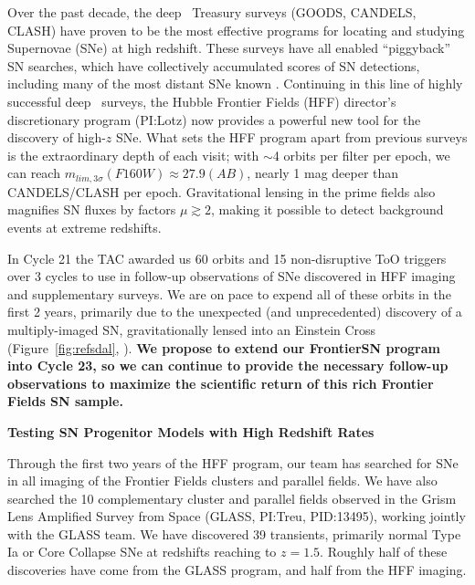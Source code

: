 \documentclass[12pt]{article}
\begin{document}
%
%
\justification          %

Over the past decade, the deep \HST\ Treasury surveys (GOODS, CANDELS,
CLASH) have proven to be the most effective programs for locating and
studying Supernovae (SNe) at high redshift.  These surveys have all
enabled ``piggyback'' SN searches, which have collectively accumulated
scores of SN detections, including many of the most distant SNe known
\citep{Riess:2007,Dahlen:2008,Graur:2014,Rodney:2014}.  Continuing in
this line of highly successful deep \HST\ surveys, the Hubble Frontier
Fields (HFF) director's discretionary program (PI:Lotz) now provides a
powerful new tool for the discovery of high-$z$ SNe.  What sets the
HFF program apart from previous surveys is the extraordinary depth of
each visit; with $\sim$4 orbits per filter per epoch, we can reach
$m_{lim,3\sigma}(F160W)\approx27.9 (AB)$, nearly 1 mag deeper than
CANDELS/CLASH per epoch. Gravitational lensing in the prime fields
also magnifies SN fluxes by factors $\mu\gtrsim2$, making it possible
to detect background events at extreme redshifts.

In Cycle 21 the TAC awarded us 60 orbits and 15 non-disruptive ToO
triggers over 3 cycles to use in follow-up observations of SNe
discovered in HFF imaging and supplementary surveys. We are on pace to
expend all of these orbits in the first 2 years, primarily due to the
unexpected (and unprecedented) discovery of a multiply-imaged SN,
gravitationally lensed into an Einstein Cross
(Figure~\ref{fig:refsdal}, \citealt{Kelly:2015}).  {\bf We propose to
  extend our FrontierSN program into Cycle 23, so we can continue to
  provide the necessary follow-up observations to maximize the
  scientific return of this rich Frontier Fields SN sample.}

\bigskip
\centerline {\bf Testing SN Progenitor Models with High Redshift Rates} 
\medskip

Through the first two years of the HFF program, our team has searched
for SNe in all imaging of the Frontier Fields clusters and parallel
fields.  We have also searched the 10 complementary cluster and
parallel fields observed in the Grism Lens Amplified Survey from Space
(GLASS, PI:Treu, PID:13495), working jointly with the GLASS team.  We
have discovered 39 transients, primarily normal Type Ia or Core
Collapse SNe at redshifts reaching to $z=1.5$.  Roughly half of these
discoveries have come from the GLASS program, and half from the HFF
imaging.
\end{document}
